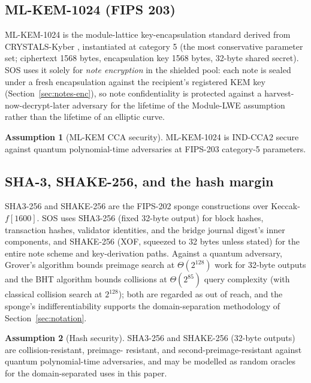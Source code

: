 \documentclass[11pt]{article}
\newcommand{\mlkem}{ML\mbox{-}KEM\mbox{-}1024}
\newcommand{\shake}{SHAKE\mbox{-}256}
\newcommand{\sha}{SHA3\mbox{-}256}
\theoremstyle{plain}
\theoremstyle{definition}
\newtheorem{assumption}{Assumption}
\theoremstyle{remark}
\begin{document}
\subsection{ML-KEM-1024 (FIPS 203)}
\label{sec:mlkem}

\mlkem{} is the module-lattice key-encapsulation standard \cite{fips203}
derived from CRYSTALS-Kyber \cite{kyber2018}, instantiated at category 5
(the most conservative parameter set; ciphertext 1568 bytes, encapsulation
key 1568 bytes, 32-byte shared secret). SOS uses it solely for
\emph{note encryption} in the shielded pool: each note is sealed under a fresh
encapsulation against the recipient's registered KEM key
(Section~\ref{sec:notes-enc}), so note confidentiality is protected against a
harvest-now-decrypt-later adversary for the lifetime of the Module-LWE
assumption rather than the lifetime of an elliptic curve.

\begin{assumption}[ML-KEM CCA security]
\label{ass:mlkem}
\mlkem{} is IND-CCA2 secure against quantum polynomial-time adversaries at
FIPS-203 category-5 parameters.
\end{assumption}

\subsection{SHA-3, SHAKE-256, and the hash margin}
\label{sec:sha3}

\sha{} and \shake{} are the FIPS-202 \cite{fips202} sponge constructions over
Keccak-$f[1600]$. SOS uses \sha{} (fixed 32-byte output) for block hashes,
transaction hashes, validator identities, and the bridge journal digest's
inner components, and \shake{} (XOF, squeezed to 32 bytes unless stated) for
the entire note scheme and key-derivation paths. Against a quantum adversary,
Grover's algorithm bounds preimage search at $\Theta(2^{128})$ work for
32-byte outputs and the BHT algorithm bounds collisions at $\Theta(2^{85})$
query complexity (with classical collision search at $2^{128}$); both are
regarded as out of reach, and the sponge's indifferentiability supports the
domain-separation methodology of Section~\ref{sec:notation}.

\begin{assumption}[Hash security]
\label{ass:hash}
\sha{} and \shake{} (32-byte outputs) are collision-resistant, preimage-
resistant, and second-preimage-resistant against quantum polynomial-time
adversaries, and may be modelled as random oracles for the domain-separated
uses in this paper.
\end{assumption}
\end{document}

